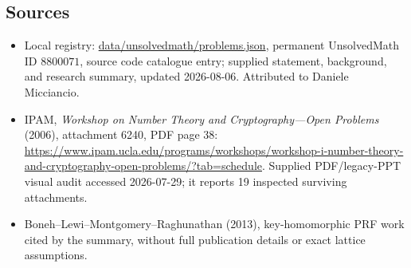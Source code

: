 \documentclass[11pt]{article}
\begin{document}
\subsection{Sources}
\begin{itemize}
\item Local registry: \url{data/unsolvedmath/problems.json}, permanent UnsolvedMath ID \(8800071\), source code catalogue entry; supplied statement, background, and research summary, updated 2026-08-06. Attributed to Daniele Micciancio.
\item IPAM, \emph{Workshop on Number Theory and Cryptography---Open Problems} (2006), attachment 6240, PDF page 38: \url{https://www.ipam.ucla.edu/programs/workshops/workshop-i-number-theory-and-cryptography-open-problems/?tab=schedule}. Supplied PDF/legacy-PPT visual audit accessed 2026-07-29; it reports 19 inspected surviving attachments.
\item Boneh--Lewi--Montgomery--Raghunathan (2013), key-homomorphic PRF work cited by the summary, without full publication details or exact lattice assumptions.
\end{itemize}
\end{document}
